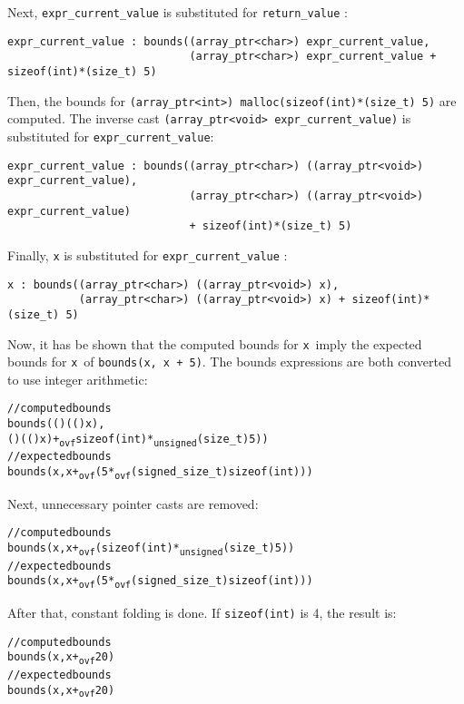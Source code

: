 Next, \verb+expr_current_value+ is substituted for \verb+return_value+ :
\begin{verbatim}
expr_current_value : bounds((array_ptr<char>) expr_current_value, 
                            (array_ptr<char>) expr_current_value + sizeof(int)*(size_t) 5)
\end{verbatim}

Then, the bounds for \verb|(array_ptr<int>) malloc(sizeof(int)*(size_t) 5)|
are computed. The inverse cast \verb|(array_ptr<void> expr_current_value)|
is substituted for \verb|expr_current_value|:

\begin{verbatim}
expr_current_value : bounds((array_ptr<char>) ((array_ptr<void>) expr_current_value), 
                            (array_ptr<char>) ((array_ptr<void>) expr_current_value)
                            + sizeof(int)*(size_t) 5) 
\end{verbatim}

Finally, \verb|x| is substituted for \verb|expr_current_value| :

\begin{verbatim}
x : bounds((array_ptr<char>) ((array_ptr<void>) x), 
           (array_ptr<char>) ((array_ptr<void>) x) + sizeof(int)*(size_t) 5) 
\end{verbatim}

Now, it has be shown that the computed bounds for \verb|x|\ imply the expected
bounds for \verb|x|\ of \verb|bounds(x, x + 5)|. The bounds expressions are both
converted to use integer arithmetic:

\begin{alltt}
// computed bounds
bounds((\arrayptrchar) ((\arrayptrvoid) x),
       (\arrayptrchar) ((\arrayptrvoid) x) +\textsubscript{ovf} sizeof(int)*\textsubscript{unsigned}(size\_t) 5))
// expected bounds
bounds(x, x +\textsubscript{ovf} (5 *\textsubscript{ovf} (signed\_size\_t) sizeof(int)))
\end{alltt}

Next, unnecessary pointer casts are removed:
\begin{alltt}
// computed bounds
bounds(x, x +\textsubscript{ovf} (sizeof(int) *\textsubscript{unsigned} (size\_t) 5))
// expected bounds
bounds(x, x +\textsubscript{ovf} (5 *\textsubscript{ovf} (signed\_size\_t) sizeof(int)))
\end{alltt}

After that, constant folding is done. If \verb+sizeof(int)+ is 4, the result is:
\begin{alltt}
// computed bounds
bounds(x, x +\textsubscript{ovf} 20)
// expected bounds
bounds(x, x +\textsubscript{ovf} 20)
\end{alltt}

